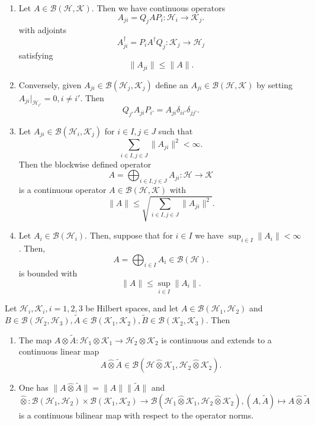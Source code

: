 \documentclass[twoside,symmetric, openany, 12pt]{./tuftebook}
\theoremstyle{definition}
\theoremstyle{definition}
\theoremstyle{definition}
\newenvironment{parts}{\begin{enumerate}[label=(\alph*)]}{\end{enumerate}}
\begin{document}
\begin{parts}
\item Let $A\in \mathcal{B}(\mathcal{H}, \mathcal{K})$. Then we have continuous operators
	\[
		A_{ji}=Q_jAP_i:\mathcal{H}_i \to \mathcal{K}_j
	.\]
	with adjoints
	\[
		A_{ji}^\dagger = P_i A^\dagger Q_j:\mathcal{K}_j\to \mathcal{H}_j
	\]
	satisfying
	\[
		\|A_{ji}\|\le \|A\|
	.\] 
\item Conversely, given $A_{ji}\in \mathcal{B}(\mathcal{H}_j, \mathcal{K}_j)$ define an $A_{ji}\in \mathcal{B}(\mathcal{H}, \mathcal{K})$ by setting $A_{ji}|_{\mathcal{H}_{i'}}=0, i\neq  i'$. Then 
	\[
		Q_{j'}A_{ji}P_{i'}=A_{ji}\delta_{ii'}\delta_{jj'}
	.\] 
\item Let $A_{ji}\in \mathcal{B}(\mathcal{H}_i, \mathcal{K}_j)$ for $i\in I, j\in J$ such that
	\[
		\sum_{i\in I,j\in J}\|A_{ji}\|^2<\infty
	.\] 
	Then the blockwise defined operator
	\[
		A = \bigoplus_{i\in I, j\in J}A_{ji}:\mathcal{H}\to \mathcal{K}
	\]
	is a continuous operator $A\in \mathcal{B}(\mathcal{H}, \mathcal{K})$ with
	\[
		\|A\|\le \sqrt{\sum_{i\in I, j\in J} \|A_{ji}\|^2} 
	.\] 
\item Let $A_i\in  \mathcal{B}(\mathcal{H}_i)$. Then, suppose that for $i\in I$ we have $\sup_{i\in I}\|A_i\|<\infty$. Then,
	\[
		A=\bigoplus_{i\in I}A_i\in \mathcal{B}(\mathcal{H}).
	\]
	is bounded with
	\[
		\|A\|\le \sup_{i\in I}\|A_i\|
	.\] 
\end{parts}

\begin{Theorem}
	Let $\mathcal{H}_i, \mathcal{K}_i, i=1,2,3$ be Hilbert spaces, and let $A\in \mathcal{B}(\mathcal{H}_1, \mathcal{H}_2)$ and $B\in \mathcal{B}(\mathcal{H}_2, \mathcal{H}_3),\tilde{A}\in \mathcal{B}(\mathcal{K}_1, \mathcal{K}_2),\tilde{B}\in \mathcal{B}(\mathcal{K}_2, \mathcal{K}_3)$. Then
	\begin{parts}
	\item The map $A\otimes \tilde{A}: \mathcal{H}_1\otimes \mathcal{K}_1 \to \mathcal{H}_2 \otimes \mathcal{K}_2$ is continuous and extends to a continuous linear map
		\[
			A \hat{\otimes}\tilde{A}\in \mathcal{B}(\mathcal{H}\hat{\otimes}\mathcal{K}_1, \mathcal{H}_2 \hat{\otimes}\mathcal{K}_2)
		.\] 
	\item One has $\|A \hat{\otimes}\tilde{A}\|=\|A\|\|\tilde{A}\|$ and $\hat{\otimes}: \mathcal{B}(\mathcal{H}_1, \mathcal{H}_2)\times \mathcal{B}(\mathcal{K}_1, \mathcal{K}_2)\to \mathcal{B}(\mathcal{H}_1\hat{\otimes}\mathcal{K}_1, \mathcal{H}_2 \hat{\otimes}\mathcal{K}_2), (A, \tilde{A})\mapsto A \hat{\otimes}\tilde{A}$ is a continuous bilinear map with respect to the operator norms.
	\end{parts}
\end{Theorem}
\end{document}
